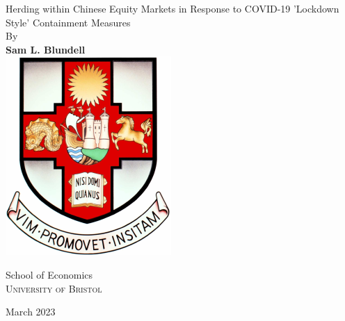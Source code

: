 \begin{titlepage}
    \begin{center}
        \vspace*{1cm}
        {\huge
        Herding within Chinese Equity Markets in Response to COVID-19
’Lockdown Style’ Containment Measures}
        \vspace{0.5cm}
        \\
        {\large By}
        \\
        \vspace{0.5cm}
        \textbf{Sam L. Blundell}
   		\vspace{1.5cm}
        \\
        \vspace{1.5cm}
       \includegraphics[scale=1]{bristolcrest_colour.pdf}
    
        \vspace{10mm}
        \large{School of Economics}
        \\
        \textsc{University of Bristol}

        \vspace{0.8cm}

        \large{March 2023}
        
    \end{center}
    
 

\end{titlepage}